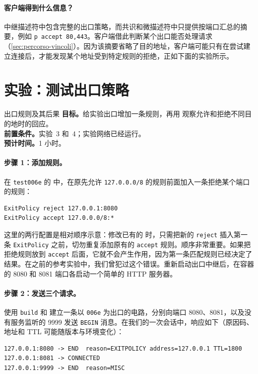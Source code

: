 \paragraph{客户端得到什么信息？}中继描述符中包含完整的出口策略，而共识和微描述符中只提供按端口汇总的摘要，例如 \texttt{p accept 80,443}。客户端借此判断某个出口能否处理请求（\cref{sec:percorso-vincoli}）。因为该摘要省略了目的地址，客户端可能只有在尝试建立连接后，才能发现某个地址受到特定规则的拒绝，正如下面的实验所示。

\section{实验：测试出口策略}\label{sec:lab-relay}

\begin{laboratorio}[14]{出口规则及其后果}
\textbf{目标。}给实验出口增加一条规则，再用  观察允许和拒绝不同目的地时的回应。\\
\textbf{前置条件。}实验~3 和~4；实验网络已经运行。\\
\textbf{预计时间。}1 小时。
\end{laboratorio}

\paragraph{步骤 1：添加规则。}在 \texttt{test006e} 的  中，在原先允许 \texttt{127.0.0.0/8} 的规则前面加入一条拒绝某个端口的规则：
\begin{lstlisting}[numbers=none]
ExitPolicy reject 127.0.0.1:8080
ExitPolicy accept 127.0.0.0/8:*
\end{lstlisting}
这里的两行配置是相对顺序示意：修改已有的  时，只需把新的 \texttt{reject} 插入第一条 \texttt{ExitPolicy} 之前，切勿重复添加原有的 \texttt{accept} 规则。顺序非常重要。如果把拒绝规则放到 \texttt{accept} 后面，它就不会产生作用，因为第一条匹配规则已经决定了结果。在之前的参考实验中，我们曾犯过这个错误。重新启动出口中继后，在容器的 8080 和 8081 端口各启动一个简单的 HTTP 服务器。

\paragraph{步骤 2：发送三个请求。}使用 \texttt{build} 和  建立一条以 \texttt{006e} 为出口的电路，分别向端口 8080、8081，以及没有服务监听的 9999 发送 \texttt{BEGIN} 消息。在我们的一次会话中，响应如下（原因码、地址和 TTL 可能随版本与环境变化）：
\begin{lstlisting}[numbers=none]
127.0.0.1:8080 -> END  reason=EXITPOLICY address=127.0.0.1 TTL=1800
127.0.0.1:8081 -> CONNECTED
127.0.0.1:9999 -> END  reason=MISC
\end{lstlisting}

